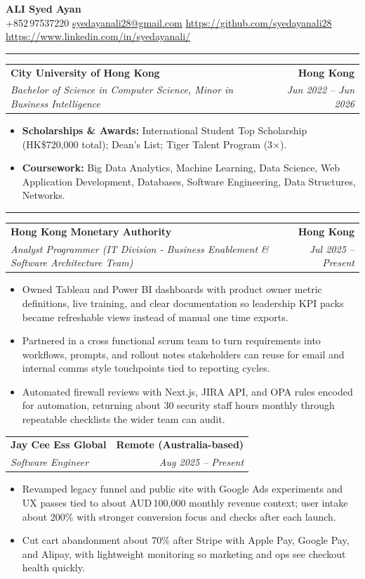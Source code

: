 \documentclass[10pt,a4paper]{article}
\makeatletter
\newcommand{\ressection}[1]{%
  \vspace{0.8em}%
  \noindent{\large\scshape\bfseries #1}\par\nobreak
  \vspace{-\parskip}%
  \noindent\rule{\linewidth}{0.1pt}\par\nobreak
  \vspace{-\parskip}%
}
\newcommand{\resumeSubheading}[4]{%
  \vspace{0.6em}%
  \begin{tabular*}{\textwidth}{l@{\extracolsep{\fill}}r}
    \textbf{#1} & \textbf{#2} \\
    \textit{\small #3} & \textit{\small #4} \\
  \end{tabular*}\vspace{0.32em}}
\makeatother
\begin{document}
\begin{center}
  {\LARGE\bfseries ALI Syed Ayan}\\[0.35em]
  \small
  +852\,97537220 \;\textbar\;
  \href{mailto:syedayanali28@gmail.com}{syedayanali28@gmail.com} \;\textbar\;
  \href{https://github.com/syedayanali28}{https://github.com/syedayanali28} \;\textbar\;
  \href{https://www.linkedin.com/in/syedayanali/}{https://www.linkedin.com/in/syedayanali/}
\end{center}
\vspace{0.55em}
\small

\ressection{Education}
\resumeSubheading{City University of Hong Kong}{Hong Kong}{Bachelor of Science in Computer Science, Minor in Business Intelligence}{Jun 2022 -- Jun 2026}
\begin{itemize}
  \item \textbf{Scholarships \& Awards:} International Student Top Scholarship (HK\$720{,}000 total); Dean's List; Tiger Talent Program (3$\times$).
  \item \textbf{Coursework:} Big Data Analytics, Machine Learning, Data Science, Web Application Development, Databases, Software Engineering, Data Structures, Networks.
\end{itemize}

\ressection{Work Experience}

\resumeSubheading{Hong Kong Monetary Authority}{Hong Kong}{Analyst Programmer (IT Division - Business Enablement \& Software Architecture Team)}{Jul 2025 -- Present}
\begin{itemize}
  \item Owned Tableau and Power BI dashboards with product owner metric definitions, live training, and clear documentation so leadership KPI packs became refreshable views instead of manual one time exports.
  \item Partnered in a cross functional scrum team to turn requirements into workflows, prompts, and rollout notes stakeholders can reuse for email and internal comms style touchpoints tied to reporting cycles.
  \item Automated firewall reviews with Next.js, JIRA API, and OPA rules encoded for automation, returning about 30 security staff hours monthly through repeatable checklists the wider team can audit.
\end{itemize}

\resumeSubheading{Jay Cee Ess Global}{Remote (Australia-based)}{Software Engineer}{Aug 2025 -- Present}
\begin{itemize}
  \item Revamped legacy funnel and public site with Google Ads experiments and UX passes tied to about AUD\,100{,}000 monthly revenue context; user intake about 200\% with stronger conversion focus and checks after each launch.
  \item Cut cart abandonment about 70\% after Stripe with Apple Pay, Google Pay, and Alipay, with lightweight monitoring so marketing and ops see checkout health quickly.
\end{itemize}
\end{document}
